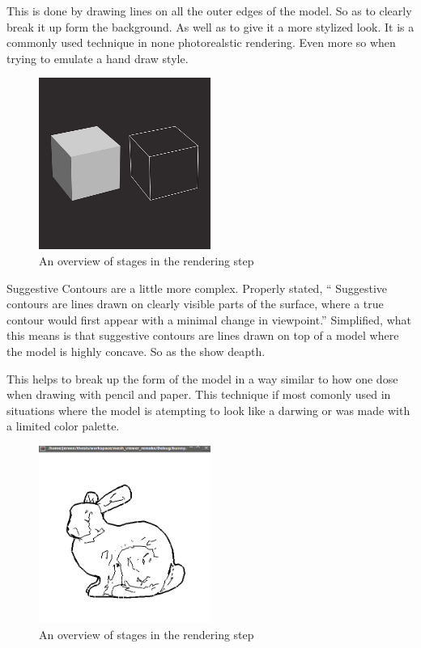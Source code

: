 This is done by drawing lines on all the outer edges of the model. So as to clearly break it up form the background. As well as to give it a more stylized look. It is a commonly used technique in none photorealstic rendering. Even more so when trying to emulate a hand draw style.

\begin{figure}[h]
    \centering
    \includegraphics[width=0.5\textwidth]{img/Contour.jpg}
    \caption{An overview of stages in the rendering step}
    \label{fig-render-overview}
\end{figure}

Suggestive Contours are a little more complex. Properly stated, “ Suggestive contours are lines drawn on clearly visible parts of the surface, where a true contour would first appear with a minimal change in viewpoint.”  \cite{Contours} Simplified, what this means is that suggestive contours are lines drawn on top of a model where the model is highly concave. So as the show deapth.

This helps to break up the form of the model in a way similar to how one dose when drawing with pencil and paper. This technique if most comonly used in situations where the model is atempting to look like a darwing or was made with a limited color palette.

\begin{figure}[h]
    \centering
    \includegraphics[width=0.5\textwidth]{img/SuggestiveContours.png}
    \caption{An overview of stages in the rendering step}
    \label{fig-render-overview}
\end{figure}

